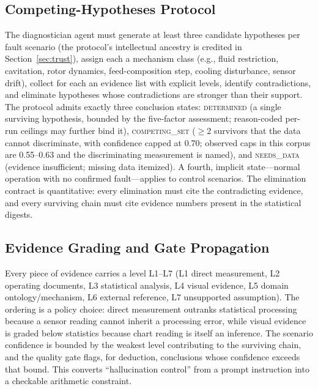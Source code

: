 \documentclass[preprint,10pt]{elsarticle}
\begin{document}
\subsection{Competing-Hypotheses Protocol}
The diagnostician agent must generate at least three candidate hypotheses per fault scenario (the protocol's intellectual ancestry is credited in Section~\ref{sec:trust}), assign each a mechanism class (e.g., fluid restriction, cavitation, rotor dynamics, feed-composition step, cooling disturbance, sensor drift), collect for each an evidence list with explicit levels, identify contradictions, and eliminate hypotheses whose contradictions are stronger than their support. The protocol admits exactly three conclusion states: \mbox{\textsc{determined}} (a single surviving hypothesis, bounded by the five-factor assessment; reason-coded per-run ceilings may further bind it), \mbox{\textsc{competing\_set}} ($\ge$2 survivors that the data cannot discriminate, with confidence capped at 0.70; observed caps in this corpus are 0.55--0.63 and the discriminating measurement is named), and \mbox{\textsc{needs\_data}} (evidence insufficient; missing data itemized). A fourth, implicit state---normal operation with no confirmed fault---applies to control scenarios. The elimination contract is quantitative: every elimination must cite the contradicting evidence, and every surviving chain must cite evidence numbers present in the statistical digests.

\subsection{Evidence Grading and Gate Propagation}\label{sec:method-grading}
Every piece of evidence carries a level L1--L7 (L1 direct measurement, L2 operating documents, L3 statistical analysis, L4 visual evidence, L5 domain ontology/mechanism, L6 external reference, L7 unsupported assumption). The ordering is a policy choice: direct measurement outranks statistical processing because a sensor reading cannot inherit a processing error, while visual evidence is graded below statistics because chart reading is itself an inference. The scenario confidence is bounded by the weakest level contributing to the surviving chain, and the quality gate flags, for deduction, conclusions whose confidence exceeds that bound. This converts ``hallucination control'' from a prompt instruction into a checkable arithmetic constraint.
\end{document}
